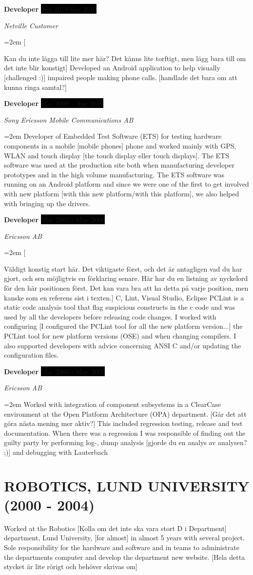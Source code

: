 \documentclass[paper=a4,fontsize=11pt]{scrartcl}
\newcommand{\sepspace}{\vspace*{1em}}
\newcommand{\NewPart}[1]{\section*{\uppercase{#1}}}
\newcommand{\EducationEntry}[4]{
		\noindent \textbf{#1} \hfill 					%
		\colorbox{Black}{%
			\parbox{6em}{%
			\hfill\color{White}#2}} \par				%
		\noindent \textit{#3} \par					%
		\noindent\hangindent=2em\hangafter=0 \small #4 	%
		\normalsize \par}
\newcommand{\WorkEntry}[4]{						%
		\noindent \textbf{#1} \hfill 					%
		\colorbox{Black}{\color{White}#2} \par		%
		\noindent \textit{#3} \par					%
		\noindent\hangindent=2em\hangafter=0 \small #4 	%
		\normalsize \par}
\begin{document}
\WorkEntry{Developer}{Jun 2010-Sep 2010}{Netville Customer}
[Kan du inte lägga till lite mer här? Det känns lite torftigt, men lägg bara till om det inte blir konstigt]
{Developed an Android application to help visually [challenged :)] impaired people making phone calls. [handlade det bara om att kunna ringa samtal?]} %
\sepspace

\WorkEntry{Developer}{Mar 2009 - Apr 2010}{Sony Ericsson Mobile Communications AB}
  {Developer of Embedded Test Software (ETS) for testing hardware components in a mobile [mobile phones]
  phone and worked mainly with GPS, WLAN and touch display [the touch display eller touch displays]. The ETS software was used at 
  the production site both when manufacturing developer prototypes and in the high volume 
  manufacturing. The ETS software was running on an Android platform and since we were one
  of the first to get involved with new platform [with this new platform/with this platform], we also helped with bringing up the drivers.}
\sepspace

\WorkEntry{Developer}{Mar 2005 - May 2008}{Ericsson AB}	
[Väldigt konstig start här. Det viktigaste först, och det är antagligen vad du har gjort, och sen möjligtvis en förklaring senare. Här har du en listning av nyckelord för den här positionen först. Det kan vara bra att ha detta på varje position, men kanske som en referens sist i texten.]
  {C, Lint, Visual Studio, Eclipse PCLint is a static code analysis tool that flag suspicious 
    constructs in the c code and was used by all the developers before releasing code changes. 
  I worked with configuring [I configured the PCLint tool for all the new platform version...] the PCLint tool for new platform versions (OSE) and when changing 
  compilers. I also supported developers with advice concerning ANSI C and/or updating the 
  configuration files. 
  }
\sepspace

\WorkEntry{Developer}{Mar 2005 - May 2007}{Ericsson AB}		
  {Worked with integration of component subsystems in a ClearCase environment at the Open Platform 
  Architecture (OPA) department. [Går det att göra nästa mening mer aktiv?] This included regression testing, release and test documentation. 
  When there was a regression I was responsible of finding out the guilty party by performing log-, 
  dump analysis [gjorde du en analys av analysen? ;)] and debugging with Lauterbach}
\sepspace

\NewPart{Robotics, Lund University (2000 - 2004)}{Worked at the Robotics [Kolla om det inte ska vara stort D i Department] department, Lund University,
  [for almost] in almost 5 years with several project. Sole responsibility for the hardware and software 
  and in teams to administrate the departments computer and develop the department new website.}
  [Hela detta stycket är lite rörigt och behöver skrivas om]
\sepspace
\end{document}
